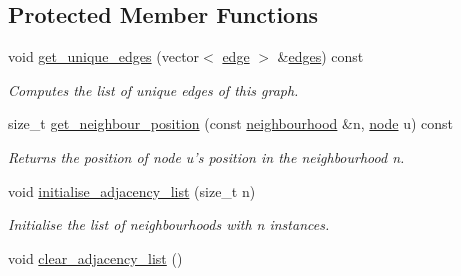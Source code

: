\subsection*{Protected Member Functions}
\begin{DoxyCompactItemize}
\item 
void \hyperlink{classlgraph_1_1utils_1_1uugraph_abf90763a86587e8d45430fe224912cf6}{get\-\_\-unique\-\_\-edges} (vector$<$ \hyperlink{namespacelgraph_1_1utils_a6510284ce1b1ae5dc97ce5d2de426e10}{edge} $>$ \&\hyperlink{classlgraph_1_1utils_1_1uxgraph_ade877f3a9cf71d844cfe7b6c4f8aae10}{edges}) const 
\begin{DoxyCompactList}\small\item\em Computes the list of unique edges of this graph. \end{DoxyCompactList}\item 
size\-\_\-t \hyperlink{classlgraph_1_1utils_1_1xxgraph_aac7ef2134cad9529869f1334de7892d9}{get\-\_\-neighbour\-\_\-position} (const \hyperlink{namespacelgraph_1_1utils_a0f2ef47028a466d26841709e705390ac}{neighbourhood} \&n, \hyperlink{namespacelgraph_1_1utils_a7bd66ede3805ef121bc2835bd48de0cf}{node} u) const 
\begin{DoxyCompactList}\small\item\em Returns the position of node {\itshape u's} position in the neighbourhood {\itshape n}. \end{DoxyCompactList}\item 
\hypertarget{classlgraph_1_1utils_1_1xxgraph_a2201aaff5e9ffa29a9b3abfde705dd46}{void \hyperlink{classlgraph_1_1utils_1_1xxgraph_a2201aaff5e9ffa29a9b3abfde705dd46}{initialise\-\_\-adjacency\-\_\-list} (size\-\_\-t n)}\label{classlgraph_1_1utils_1_1xxgraph_a2201aaff5e9ffa29a9b3abfde705dd46}

\begin{DoxyCompactList}\small\item\em Initialise the list of neighbourhoods with {\itshape n} instances. \end{DoxyCompactList}\item 
\hypertarget{classlgraph_1_1utils_1_1xxgraph_a6523402d0ec66918b95de23d2bee38fc}{void \hyperlink{classlgraph_1_1utils_1_1xxgraph_a6523402d0ec66918b95de23d2bee38fc}{clear\-\_\-adjacency\-\_\-list} ()}\label{classlgraph_1_1utils_1_1xxgraph_a6523402d0ec66918b95de23d2bee38fc}


\end{DoxyCompactItemize}
